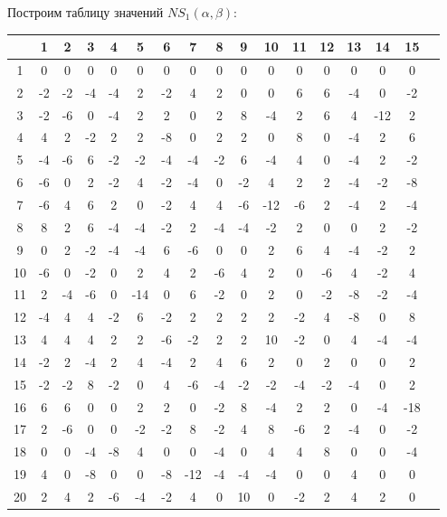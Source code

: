 Построим таблицу значений $NS_1(\alpha, \beta):$

\begin{tabular}{c||c|c|c|c|c|c|c|c|c|c|c|c|c|c|c|c}
& 1 & 2 & 3 & 4 & 5 & 6 & 7 & 8 & 9 & 10 & 11 & 12 & 13 & 14 & 15 \\
\hline
\hline
1 & 0 & 0 & 0 & 0 & 0 & 0 & 0 & 0 & 0 & 0 & 0 & 0 & 0 & 0 & 0 \\
\hline
2 & -2 & -2 & -4 & -4 & 2 & -2 & 4 & 2 & 0 & 0 & 6 & 6 & -4 & 0 & -2 \\
\hline
3 & -2 & -6 & 0 & -4 & 2 & 2 & 0 & 2 & 8 & -4 & 2 & 6 & 4 & -12 & 2 \\
\hline
4 & 4 & 2 & -2 & 2 & 2 & -8 & 0 & 2 & 2 & 0 & 8 & 0 & -4 & 2 & 6 \\
\hline
5 & -4 & -6 & 6 & -2 & -2 & -4 & -4 & -2 & 6 & -4 & 4 & 0 & -4 & 2 & -2 \\
\hline
6 & -6 & 0 & 2 & -2 & 4 & -2 & -4 & 0 & -2 & 4 & 2 & 2 & -4 & -2 & -8 \\
\hline
7 & -6 & 4 & 6 & 2 & 0 & -2 & 4 & 4 & -6 & -12 & -6 & 2 & -4 & 2 & -4 \\
\hline
8 & 8 & 2 & 6 & -4 & -4 & -2 & 2 & -4 & -4 & -2 & 2 & 0 & 0 & 2 & -2 \\
\hline
9 & 0 & 2 & -2 & -4 & -4 & 6 & -6 & 0 & 0 & 2 & 6 & 4 & -4 & -2 & 2 \\
\hline
10 & -6 & 0 & -2 & 0 & 2 & 4 & 2 & -6 & 4 & 2 & 0 & -6 & 4 & -2 & 4 \\
\hline
11 & 2 & -4 & -6 & 0 & -14 & 0 & 6 & -2 & 0 & 2 & 0 & -2 & -8 & -2 & -4 \\
\hline
12 & -4 & 4 & 4 & -2 & 6 & -2 & 2 & 2 & 2 & 2 & -2 & 4 & -8 & 0 & 8 \\
\hline
13 & 4 & 4 & 4 & 2 & 2 & -6 & -2 & 2 & 2 & 10 & -2 & 0 & 4 & -4 & -4 \\
\hline
14 & -2 & 2 & -4 & 2 & 4 & -4 & 2 & 4 & 6 & 2 & 0 & 2 & 0 & 0 & 2 \\
\hline
15 & -2 & -2 & 8 & -2 & 0 & 4 & -6 & -4 & -2 & -2 & -4 & -2 & -4 & 0 & 2 \\
\hline
16 & 6 & 6 & 0 & 0 & 2 & 2 & 0 & -2 & 8 & -4 & 2 & 2 & 0 & -4 & -18 \\
\hline
17 & 2 & -6 & 0 & 0 & -2 & -2 & 8 & -2 & 4 & 8 & -6 & 2 & -4 & 0 & -2 \\
\hline
18 & 0 & 0 & -4 & -8 & 4 & 0 & 0 & -4 & 0 & 4 & 4 & 8 & 0 & 0 & -4 \\
\hline
19 & 4 & 0 & -8 & 0 & 0 & -8 & -12 & -4 & -4 & -4 & 0 & 0 & 4 & 0 & 0 \\
\hline
20 & 2 & 4 & 2 & -6 & -4 & -2 & 4 & 0 & 10 & 0 & -2 & 2 & 4 & 2 & 0 \\

\end{tabular}
